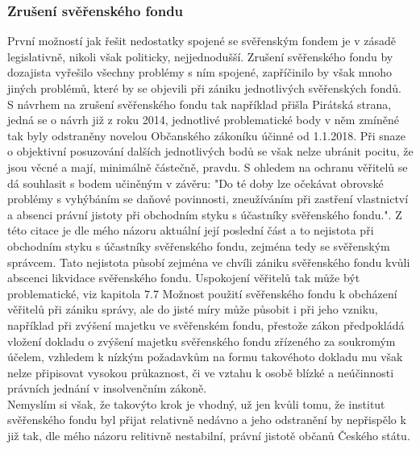 \documentclass{article}
\begin{document}
\subsubsection{Zrušení svěřenského fondu}

První možností jak řešit nedostatky spojené se svěřenským fondem je v zásadě legislativně, nikoli však politicky, nejjednodušší. Zrušení svěřenského fondu by dozajista vyřešilo všechny problémy s ním spojené, zapříčinilo by však mnoho jiných problémů, které by se objevili při zániku jednotlivých svěřenských fondů.\\

S návrhem na zrušení svěřenského fondu tak například přišla Pirátská strana, jedná se o návrh již z roku 2014, jednotlivé problematické body v něm zmíněné tak byly odstraněny novelou Občanského zákoníku účinné od 1.1.2018. Při snaze o objektivní posuzování dalších jednotlivých bodů se však nelze ubránit pocitu, že jsou věcné a mají, minimálně částečně, pravdu. S ohledem na ochranu věřitelů se dá souhlasit s bodem učiněným v závěru: "Do té doby lze očekávat obrovské problémy s vyhýbáním se daňové povinnosti, zneužíváním při zastření vlastnictví a absenci právní jistoty při obchodním styku s účastníky svěřenského fondu.". Z této citace je dle mého názoru aktuální její poslední část a to nejistota při obchodním styku s účastníky svěřenského fondu, zejména tedy se svěřenským správcem. Tato nejistota působí zejména ve chvíli zániku svěřenského fondu kvůli abscenci likvidace svěřenského fondu. Uspokojení věřitelů tak může být problematické, viz kapitola 7.7 Možnost použití svěřenského fondu k obcházení věřitelů při zániku správy, ale do jisté míry může působit i při jeho vzniku, například při zvýšení majetku ve svěřenském fondu, přestože zákon předpokládá vložení dokladu o zvýšení majetku svěřenského fondu zřízeného za soukromým účelem, vzhledem k nízkým požadavkům na formu takovéhoto dokladu mu však nelze připisovat vysokou průkaznost, či ve vztahu k osobě blízké a neúčinnosti právních jednání v insolvenčním zákoně.\\ 

Nemyslím si však, že takovýto krok je vhodný, už jen kvůli tomu, že institut svěřenského fondu byl přijat relativně nedávno a jeho odstranění by nepřispělo k již tak, dle mého názoru relitivně nestabilní, právní jistotě občanů Českého státu.\\

\end{document}
